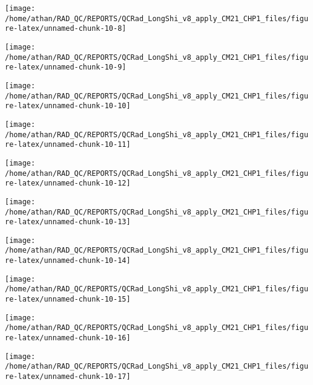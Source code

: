\documentclass[
  10pt,
  a4paper,oneside]{article}
\begin{document}
\begin{center}\texttt{[image: /home/athan/RAD\_QC/REPORTS/QCRad\_LongShi\_v8\_apply\_CM21\_CHP1\_files/figure-latex/unnamed-chunk-10-8]} \end{center}

\begin{center}\texttt{[image: /home/athan/RAD\_QC/REPORTS/QCRad\_LongShi\_v8\_apply\_CM21\_CHP1\_files/figure-latex/unnamed-chunk-10-9]} \end{center}

\begin{center}\texttt{[image: /home/athan/RAD\_QC/REPORTS/QCRad\_LongShi\_v8\_apply\_CM21\_CHP1\_files/figure-latex/unnamed-chunk-10-10]} \end{center}

\begin{center}\texttt{[image: /home/athan/RAD\_QC/REPORTS/QCRad\_LongShi\_v8\_apply\_CM21\_CHP1\_files/figure-latex/unnamed-chunk-10-11]} \end{center}

\begin{center}\texttt{[image: /home/athan/RAD\_QC/REPORTS/QCRad\_LongShi\_v8\_apply\_CM21\_CHP1\_files/figure-latex/unnamed-chunk-10-12]} \end{center}

\begin{center}\texttt{[image: /home/athan/RAD\_QC/REPORTS/QCRad\_LongShi\_v8\_apply\_CM21\_CHP1\_files/figure-latex/unnamed-chunk-10-13]} \end{center}

\begin{center}\texttt{[image: /home/athan/RAD\_QC/REPORTS/QCRad\_LongShi\_v8\_apply\_CM21\_CHP1\_files/figure-latex/unnamed-chunk-10-14]} \end{center}

\begin{center}\texttt{[image: /home/athan/RAD\_QC/REPORTS/QCRad\_LongShi\_v8\_apply\_CM21\_CHP1\_files/figure-latex/unnamed-chunk-10-15]} \end{center}

\begin{center}\texttt{[image: /home/athan/RAD\_QC/REPORTS/QCRad\_LongShi\_v8\_apply\_CM21\_CHP1\_files/figure-latex/unnamed-chunk-10-16]} \end{center}

\begin{center}\texttt{[image: /home/athan/RAD\_QC/REPORTS/QCRad\_LongShi\_v8\_apply\_CM21\_CHP1\_files/figure-latex/unnamed-chunk-10-17]} \end{center}
\end{document}
